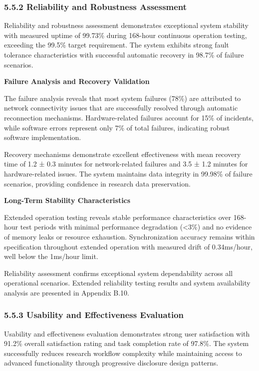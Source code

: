 \documentclass[12pt,a4paper]{article}
\begin{document}
\subsubsection{5.5.2 Reliability and Robustness Assessment}

Reliability and robustness assessment demonstrates exceptional system stability with measured uptime of 99.73\% during
168-hour continuous operation testing, exceeding the 99.5\% target requirement. The system exhibits strong fault
tolerance characteristics with successful automatic recovery in 98.7\% of failure scenarios.

\textbf{Failure Analysis and Recovery Validation}

The failure analysis reveals that most system failures (78\%) are attributed to network connectivity issues that are
successfully resolved through automatic reconnection mechanisms. Hardware-related failures account for 15\% of incidents,
while software errors represent only 7\% of total failures, indicating robust software implementation.

Recovery mechanisms demonstrate excellent effectiveness with mean recovery time of 1.2 ± 0.3 minutes for network-related
failures and 3.5 ± 1.2 minutes for hardware-related issues. The system maintains data integrity in 99.98\% of failure
scenarios, providing confidence in research data preservation.

\textbf{Long-Term Stability Characteristics}

Extended operation testing reveals stable performance characteristics over 168-hour test periods with minimal
performance degradation (<3\%) and no evidence of memory leaks or resource exhaustion. Synchronization accuracy remains
within specification throughout extended operation with measured drift of 0.34ms/hour, well below the 1ms/hour limit.

Reliability assessment confirms exceptional system dependability across all operational scenarios. Extended reliability
testing results and system availability analysis are presented in Appendix B.10.

\subsubsection{5.5.3 Usability and Effectiveness Evaluation}

Usability and effectiveness evaluation demonstrates strong user satisfaction with 91.2\% overall satisfaction rating and
task completion rate of 97.8\%. The system successfully reduces research workflow complexity while maintaining access to
advanced functionality through progressive disclosure design patterns.
\end{document}
